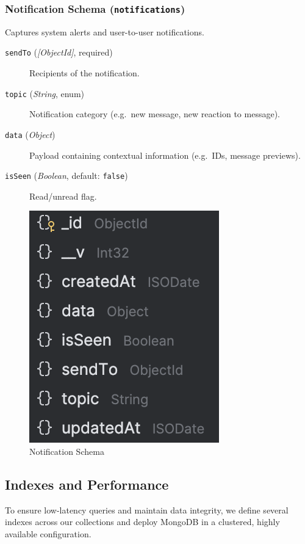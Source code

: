 \subsubsection{Notification Schema (\texttt{notifications})}
Captures system alerts and user-to-user notifications.
\begin{description}
  \item[\texttt{sendTo} (\emph{[ObjectId]}, required)]  
    Recipients of the notification.
  \item[\texttt{topic} (\emph{String}, enum)]  
    Notification category (e.g.\ new message, new reaction to message).
  \item[\texttt{data} (\emph{Object})]  
    Payload containing contextual information (e.g.\ IDs, message previews).
  \item[\texttt{isSeen} (\emph{Boolean}, default: \texttt{false})]  
    Read/unread flag.
\end{description}

\begin{figure}[H]
  \centering
  \includegraphics{notification-schema.png}
  \caption*{Notification Schema}
  \label{fig:notification-schema}
\end{figure}


\subsection{Indexes and Performance}

To ensure low-latency queries and maintain data integrity, we define several indexes across our collections and deploy MongoDB in a clustered, highly available configuration.

